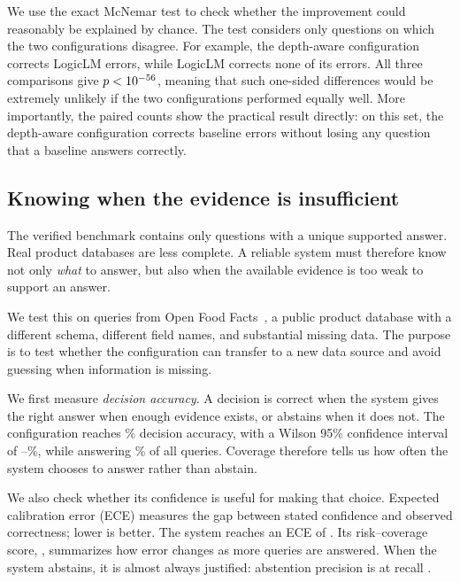 \documentclass[conference]{IEEEtran}
\begin{document}
We use the exact McNemar test to check whether the improvement could reasonably
be explained by chance. The test considers only questions on which the two
configurations disagree. For example, the depth-aware configuration corrects
\DiscLogicLMSysOnly{} LogicLM errors, while LogicLM corrects none of its
errors. All three comparisons give $p < 10^{-56}$, meaning that such
one-sided differences would be extremely unlikely if the two configurations
performed equally well. More importantly, the paired counts show the practical
result directly: on this set, the depth-aware configuration corrects baseline
errors without losing any question that a baseline answers correctly.


\subsection{Knowing when the evidence is insufficient}
\label{sec:off}

The verified benchmark contains only questions with a unique supported answer.
Real product databases are less complete. A reliable system must therefore know
not only \emph{what} to answer, but also when the available evidence is too weak
to support an answer.

We test this on \OffN{} queries from Open Food Facts~\cite{openfoodfacts}, a
public product database with a different schema, different field names, and
substantial missing data. The purpose is to test whether the
configuration can transfer to a new data source and avoid guessing when
information is missing.

We first measure \emph{decision accuracy}. A decision is correct when the
system gives the right answer when enough evidence exists, or abstains when it
does not. The configuration reaches \OffAcc\% decision accuracy, with a Wilson
95\% confidence interval of \OffAccLo--\OffAccHi\%, while answering
\OffCoverage\% of all queries. Coverage therefore tells us how often the
system chooses to answer rather than abstain.

We also check whether its confidence is useful for making that choice. Expected
calibration error (ECE) measures the gap between stated confidence and observed
correctness; lower is better. The system reaches an ECE of \OffEce{}. Its
risk--coverage score, \OffAurc{}, summarizes how error changes as more queries
are answered. When the system abstains, it is almost always justified:
abstention precision is \OffAbstainPrec{} at recall \OffAbstainRec{}.
\end{document}
